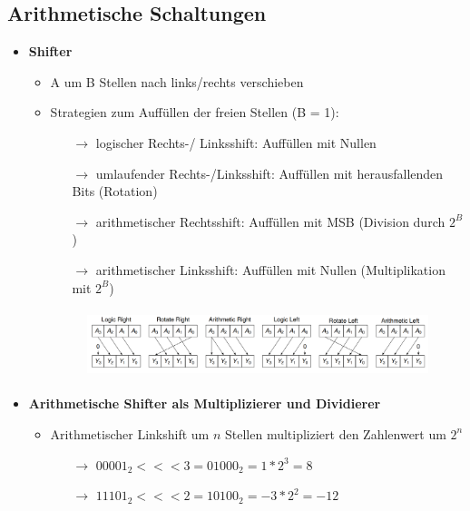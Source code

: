 \documentclass[11pt,a4paper]{article}
\begin{document}
\subsection{Arithmetische Schaltungen}
\begin{itemize}

\item \textbf{Shifter}
	\begin{itemize}
	\item A um B Stellen nach links/rechts verschieben
	\item Strategien zum Auffüllen der freien Stellen (B = 1):
		\begin{itemize}
		\item[$\rightarrow$] logischer Rechts-/ Linksshift: Auffüllen mit Nullen
		\item[$\rightarrow$] umlaufender Rechts-/Linksshift: Auffüllen mit herausfallenden Bits (Rotation)
		\item[$\rightarrow$] arithmetischer Rechtsshift: Auffüllen mit MSB (Division durch $2^B$)
		\item[$\rightarrow$] arithmetischer Linksshift: Auffüllen mit Nullen (Multiplikation mit $2^B$)
		\end{itemize}
	\item[]
		\begin{figure}[H]
			\begin{center}
			\includegraphics[height=2cm]{shifter1}
			\end{center}
		\end{figure}
	\end{itemize}
	
\pagebreak	
	
\item \textbf{Arithmetische Shifter als Multiplizierer und Dividierer}
	\begin{itemize}
	\item Arithmetischer Linkshift um $n$ Stellen multipliziert den Zahlenwert um $2^n$
		\begin{itemize}
		\item[$\rightarrow$] $00001_2 <<< 3 = 01000_2 = 1 * 2^3 = 8$
		\item[$\rightarrow$] $11101_2 <<< 2 = 10100_2 = -3 * 2^2 = -12$
		\end{itemize}
	

\end{itemize}
\end{itemize}
\end{document}
